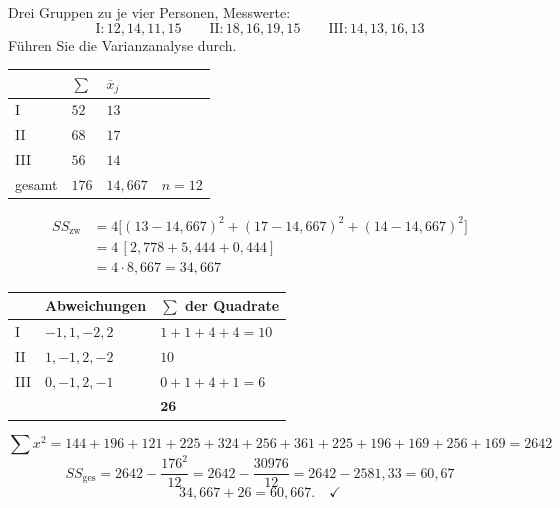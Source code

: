 \begin{aufgabe}
Drei Gruppen zu je vier Personen, Messwerte:
\[ \text{I}: 12, 14, 11, 15 \qquad \text{II}: 18, 16, 19, 15 \qquad \text{III}: 14, 13, 16, 13 \]
Führen Sie die Varianzanalyse durch.

\loesung
{}
\begin{center}
\renewcommand{\arraystretch}{1.42}
\begin{tabular}{@{}P{1.4cm}P{1.6cm}P{1.6cm}P{2.2cm}@{}}
\toprule
& $\sum$ & $\overline x_j$ & \\
\midrule
I & $52$ & $13$ & \\
II & $68$ & $17$ & \\
III & $56$ & $14$ & \\
\midrule
gesamt & $176$ & $14{,}667$ & $n = 12$\\
\bottomrule
\end{tabular}
\end{center}

\begin{align*}
SS_{\text{zw}} &= 4\bigl[(13-14{,}667)^2 + (17-14{,}667)^2 + (14-14{,}667)^2\bigr]\\
&= 4\,[2{,}778 + 5{,}444 + 0{,}444]\\
&= 4 \cdot 8{,}667 = 34{,}667
\end{align*}

\begin{center}
{\small
\renewcommand{\arraystretch}{1.35}
\begin{tabular}{@{}P{1.2cm}P{3.6cm}P{1.6cm}@{}}
\toprule
& \textbf{Abweichungen} & $\sum$ der Quadrate\\
\midrule
I & $-1, 1, -2, 2$ & $1+1+4+4 = 10$\\
II & $1, -1, 2, -2$ & $10$\\
III & $0, -1, 2, -1$ & $0+1+4+1 = 6$\\
\midrule
& & $\mathbf{26}$\\
\bottomrule
\end{tabular}}
\end{center}

\[ \sum x^2 = 144+196+121+225+324+256+361+225+196+169+256+169 = 2642 \]
\[ SS_{\text{ges}} = 2642 - \frac{176^2}{12} = 2642 - \frac{30976}{12} = 2642 - 2581{,}33 = 60{,}67 \]
\[ 34{,}667 + 26 = 60{,}667 . \quad \checkmark \]


\end{aufgabe}
